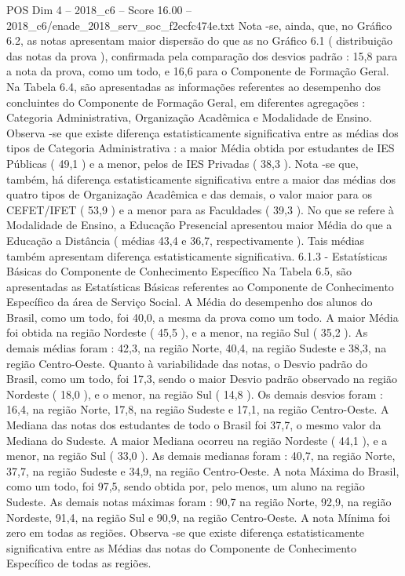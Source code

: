 \begin{textsample}{POS Dim 4 – 2018\_c6 – Score 16.00 – 2018\_c6/enade\_2018\_serv\_soc\_f2ecfc474e.txt}
Nota -se, ainda, que, no Gráfico 6.2, as notas apresentam maior dispersão do que as no Gráfico 6.1 ( distribuição das notas da prova ), confirmada pela comparação dos desvios padrão : 15,8 para a nota da prova, como um todo, e 16,6 para o Componente de Formação Geral.
Na Tabela 6.4, são apresentadas as informações referentes ao desempenho dos concluintes do Componente de Formação Geral, em diferentes agregações : Categoria Administrativa, Organização Acadêmica e Modalidade de Ensino.
Observa -se que existe diferença estatisticamente significativa entre as médias dos tipos de Categoria Administrativa : a maior Média obtida por estudantes de IES Públicas ( 49,1 ) e a menor, pelos de IES Privadas ( 38,3 ).
Nota -se que, também, há diferença estatisticamente significativa entre a maior das médias dos quatro tipos de Organização Acadêmica e das demais, o valor maior para os CEFET/IFET ( 53,9 ) e a menor para as Faculdades ( 39,3 ).
No que se refere à Modalidade de Ensino, a Educação Presencial apresentou maior Média do que a Educação a Distância ( médias 43,4 e 36,7, respectivamente ).
Tais médias também apresentam diferença estatisticamente significativa. 6.1.3 - Estatísticas Básicas do Componente de Conhecimento Específico Na Tabela 6.5, são apresentadas as Estatísticas Básicas referentes ao Componente de Conhecimento Específico da área de Serviço Social.
A Média do desempenho dos alunos do Brasil, como um todo, foi 40,0, a mesma da prova como um todo.
A maior Média foi obtida na região Nordeste ( 45,5 ), e a menor, na região Sul ( 35,2 ).
As demais médias foram : 42,3, na região Norte, 40,4, na região Sudeste e 38,3, na região Centro-Oeste.
Quanto à variabilidade das notas, o Desvio padrão do Brasil, como um todo, foi 17,3, sendo o maior Desvio padrão observado na região Nordeste ( 18,0 ), e o menor, na região Sul ( 14,8 ).
Os demais desvios foram : 16,4, na região Norte, 17,8, na região Sudeste e 17,1, na região Centro-Oeste.
A Mediana das notas dos estudantes de todo o Brasil foi 37,7, o mesmo valor da Mediana do Sudeste.
A maior Mediana ocorreu na região Nordeste ( 44,1 ), e a menor, na região Sul ( 33,0 ).
As demais medianas foram : 40,7, na região Norte, 37,7, na região Sudeste e 34,9, na região Centro-Oeste.
A nota Máxima do Brasil, como um todo, foi 97,5, sendo obtida por, pelo menos, um aluno na região Sudeste.
As demais notas máximas foram : 90,7 na região Norte, 92,9, na região Nordeste, 91,4, na região Sul e 90,9, na região Centro-Oeste.
A nota Mínima foi zero em todas as regiões.
Observa -se que existe diferença estatisticamente significativa entre as Médias das notas do Componente de Conhecimento Específico de todas as regiões.

\end{textsample}
